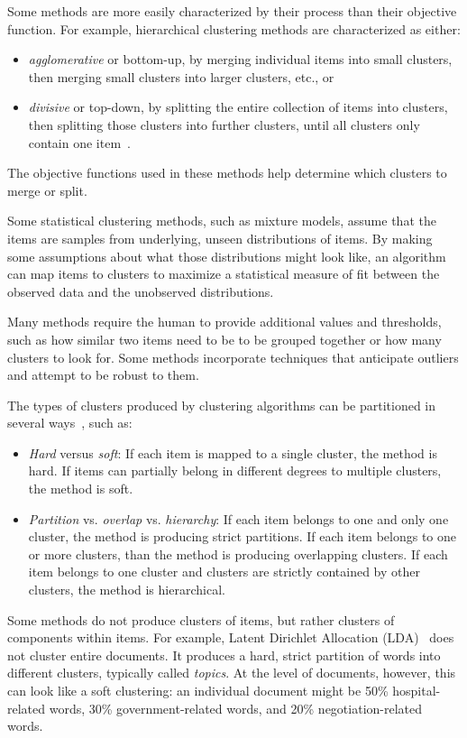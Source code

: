 Some methods are more easily characterized by their process than their objective function. For example, hierarchical clustering methods are characterized as either:

\begin{itemize}
\item {\it agglomerative} or bottom-up, by merging individual items into small clusters, then merging small clusters into larger clusters, etc., or
\item {\it divisive} or top-down, by splitting the entire collection of items into clusters, then splitting those clusters into further clusters, until all clusters only contain one item~\cite{xu2005survey}.
\end{itemize}

The objective functions used in these methods help determine which clusters to merge or split.

Some statistical clustering methods, such as mixture models, assume that the items are samples from underlying, unseen distributions of items. By making some assumptions about what those distributions might look like, an algorithm can map items to clusters to maximize a statistical measure of fit between the observed data and the unobserved distributions.

Many methods require the human to provide additional values and thresholds, such as how similar two items need to be to be grouped together or how many clusters to look for. Some methods incorporate techniques that anticipate outliers and attempt to be robust to them.

The types of clusters produced by clustering algorithms can be partitioned in several ways~\cite{wiki:clustering}, such as:

\begin{itemize}
\item {\it Hard} versus {\it soft}: If each item is mapped to a single cluster, the method is hard. If items can partially belong in different degrees to multiple clusters, the method is soft.
\item {\it Partition} vs. {\it overlap} vs. {\it hierarchy}: If each item belongs to one and only one cluster, the method is producing strict partitions. If each item belongs to one or more clusters, than the method is producing overlapping clusters. If each item belongs to one cluster and clusters are strictly contained by other clusters, the method is hierarchical.
\end{itemize}

Some methods do not produce clusters of items, but rather clusters of components within items. For example, Latent Dirichlet Allocation (LDA)~\cite{lda} does not cluster entire documents. It produces a hard, strict partition of words into different clusters, typically called {\it topics}. At the level of documents, however, this can look like a soft clustering: an individual document might be 50\% hospital-related words, 30\% government-related words, and 20\% negotiation-related words.

